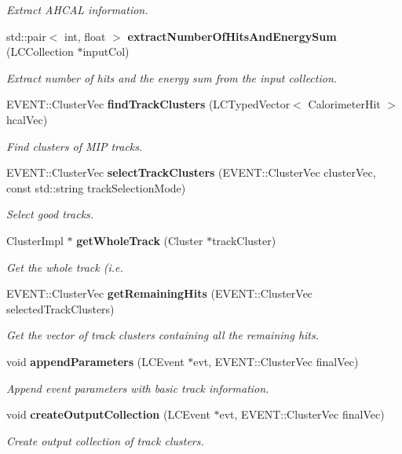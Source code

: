 \begin{DoxyCompactItemize}
\begin{DoxyCompactList}\small\item\em Extract AHCAL information. \item\end{DoxyCompactList}\item 
std::pair$<$ int, float $>$ {\bf extractNumberOfHitsAndEnergySum} (LCCollection $\ast$inputCol)
\begin{DoxyCompactList}\small\item\em Extract number of hits and the energy sum from the input collection. \item\end{DoxyCompactList}\item 
EVENT::ClusterVec {\bf findTrackClusters} (LCTypedVector$<$ CalorimeterHit $>$ hcalVec)
\begin{DoxyCompactList}\small\item\em Find clusters of MIP tracks. \item\end{DoxyCompactList}\item 
EVENT::ClusterVec {\bf selectTrackClusters} (EVENT::ClusterVec clusterVec, const std::string trackSelectionMode)
\begin{DoxyCompactList}\small\item\em Select good tracks. \item\end{DoxyCompactList}\item 
ClusterImpl $\ast$ {\bf getWholeTrack} (Cluster $\ast$trackCluster)
\begin{DoxyCompactList}\small\item\em Get the whole track (i.e. \item\end{DoxyCompactList}\item 
EVENT::ClusterVec {\bf getRemainingHits} (EVENT::ClusterVec selectedTrackClusters)
\begin{DoxyCompactList}\small\item\em Get the vector of track clusters containing all the remaining hits. \item\end{DoxyCompactList}\item 
void {\bf appendParameters} (LCEvent $\ast$evt, EVENT::ClusterVec finalVec)
\begin{DoxyCompactList}\small\item\em Append event parameters with basic track information. \item\end{DoxyCompactList}\item 
void {\bf createOutputCollection} (LCEvent $\ast$evt, EVENT::ClusterVec finalVec)
\begin{DoxyCompactList}\small\item\em Create output collection of track clusters. \item\end{DoxyCompactList}\end{DoxyCompactItemize}
